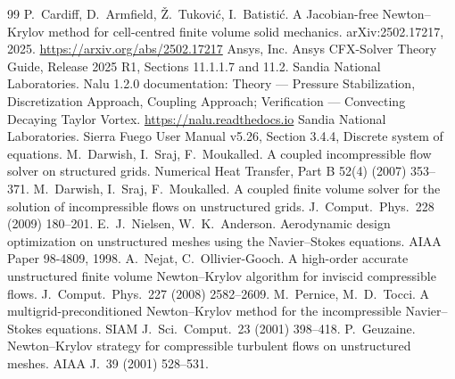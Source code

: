 \documentclass[11pt,a4paper]{article}
\begin{document}
\begin{thebibliography}{99}
\small
{} P.~Cardiff, D.~Armfield, \v{Z}.~Tukovi\'c, I.~Batisti\'c.
A Jacobian-free Newton--Krylov method for cell-centred finite volume solid mechanics.
arXiv:2502.17217, 2025. \url{https://arxiv.org/abs/2502.17217}
 Ansys, Inc. Ansys CFX-Solver Theory Guide, Release 2025 R1, Sections 11.1.1.7 and 11.2.
 Sandia National Laboratories. Nalu 1.2.0 documentation: Theory --- Pressure
Stabilization, Discretization Approach, Coupling Approach; Verification --- Convecting Decaying
Taylor Vortex. \url{https://nalu.readthedocs.io}
 Sandia National Laboratories. Sierra Fuego User Manual v5.26, Section 3.4.4, Discrete system of equations.
 M.~Darwish, I.~Sraj, F.~Moukalled. A coupled incompressible flow solver on structured grids.
Numerical Heat Transfer, Part B 52(4) (2007) 353--371.
 M.~Darwish, I.~Sraj, F.~Moukalled. A coupled finite volume solver for the solution of
incompressible flows on unstructured grids. J.\ Comput.\ Phys.\ 228 (2009) 180--201.
 E.~J.~Nielsen, W.~K.~Anderson. Aerodynamic design optimization on unstructured meshes using the
Navier--Stokes equations. AIAA Paper 98-4809, 1998.
 A.~Nejat, C.~Ollivier-Gooch. A high-order accurate unstructured finite volume Newton--Krylov
algorithm for inviscid compressible flows. J.\ Comput.\ Phys.\ 227 (2008) 2582--2609.
 M.~Pernice, M.~D.~Tocci. A multigrid-preconditioned Newton--Krylov method for the incompressible
Navier--Stokes equations. SIAM J.\ Sci.\ Comput.\ 23 (2001) 398--418.
 P.~Geuzaine. Newton--Krylov strategy for compressible turbulent flows on unstructured meshes.
AIAA J.\ 39 (2001) 528--531.
\end{thebibliography}
\end{document}
